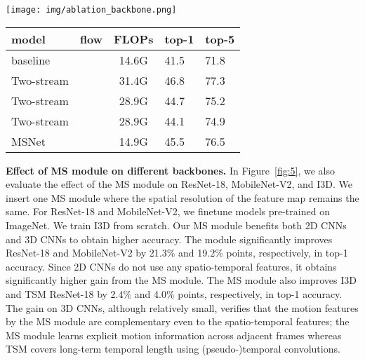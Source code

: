 \documentclass[runningheads]{llncs}
\newcommand{\cmark}{\ding{51}}\newcommand{\xmark}{\ding{55}}
\begin{document}
\begin{table}[t]
\begin{minipage}{1.0\textwidth}
    \begin{minipage}{0.41\textwidth}
        \centering
        \texttt{[image: img/ablation\_backbone.png]}
        \captionsetup{width=0.95\columnwidth}
        \label{fig:5}
    \end{minipage}
    \hfill
    \begin{minipage}{0.58\textwidth}
    \centering
    \fontsize{8pt}{9.5pt}\selectfont
    \begin{tabular}[t]{l|C{0.8cm}|c|C{0.8cm}|C{0.8cm}} 
    \toprule
      model    &  flow &   FLOPs & top-1   &   top-5   \\
      \hline
      baseline         &  & 14.6G  & 41.5 & 71.8     \\
      \hline
      Two-stream   & \cmark & 31.4G  & 46.8 & 77.3     \\
      Two-stream     & \cmark & 28.9G & 44.7 & 75.2     \\
      Two-stream      & \cmark & 28.9G & 44.1 & 74.9     \\     
      \hline
      MSNet  &  & 14.9G   & 45.5 & 76.5     \\
      \bottomrule
    \end{tabular}
    \label{twostream_table}
    \end{minipage}
\end{minipage}
\end{table}

\smallbreak
\noindent 
\textbf{Effect of MS module on different backbones.}
In Figure~\ref{fig:5}, we also evaluate the effect of the MS module on ResNet-18, MobileNet-V2, and I3D.
We insert one MS module where the spatial resolution of the feature map remains the same.
For ResNet-18 and MobileNet-V2, we finetune models pre-trained on ImageNet. We train I3D from scratch.
Our MS module benefits both 2D CNNs and 3D CNNs to obtain higher accuracy.
The module significantly improves ResNet-18 and MobileNet-V2 by 21.3\% and 19.2\% points, respectively, in top-1 accuracy.
Since 2D CNNs do not use any spatio-temporal features, it obtains significantly higher gain from the MS module.
The MS module also improves I3D and TSM ResNet-18 by 2.4\% and 4.0\% points, respectively, in top-1 accuracy.
The gain on 3D CNNs, although relatively small, verifies that the motion features by the MS module are complementary even to the spatio-temporal features; the MS module learns explicit motion information across adjacent frames whereas TSM covers long-term temporal length using (pseudo-)temporal convolutions.
\end{document}
